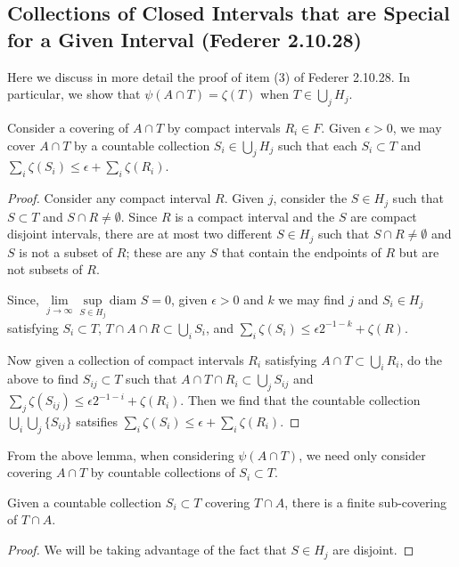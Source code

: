 \subsection{Collections of Closed Intervals that are Special for a Given Interval (Federer 2.10.28)}

Here we discuss in more detail the proof of item (3) of Federer 2.10.28. In particular, we show that 
\(\psi(A \cap T) = \zeta(T)\) when \(T \in \bigcup_j H_j\).

\begin{lemma}
Consider a covering of \(A \cap T\) by compact intervals \(R_i \in F\). Given \(\epsilon > 0\), we may
cover \(A \cap T\) by a countable collection \(S_i \in \bigcup_j H_j\) such that each \(S_i \subset T\) and
\(\sum_i \zeta(S_i) \leq \epsilon + \sum_i \zeta(R_i)\).
\end{lemma}
\begin{proof}
Consider any compact interval \(R\). Given \(j\), consider the
\(S \in H_j\) such that \(S \subset T\) and \(S \cap R \neq \emptyset\). Since \(R\) is a compact interval
and the \(S\) are compact disjoint intervals, there are at most
two different \(S \in H_j\) such that \(S \cap R \neq \emptyset\) and \(S\) is not a subset of \(R\); these
are any \(S\) that contain the endpoints of \(R\) but are not subsets of \(R\). 

Since, \(\lim\limits_{j\to \infty}\sup\limits_{S\in H_j} \text{diam } S = 0\), given \(\epsilon > 0\) and
\(k\) we may find \(j\) and \(S_i \in H_j\) satisfying \(S_i \subset T\),
\(T \cap A \cap R \subset \bigcup_i S_i\), and 
\(\sum_i \zeta(S_i) \leq \epsilon 2^{-1-k} + \zeta(R)\).

Now given a collection of compact intervals \(R_i\) satisfying \(A \cap T \subset \bigcup_i R_i\), do the above
to find \(S_{ij} \subset T\) such that \(A \cap T \cap R_i \subset \bigcup_j S_{ij}\) and
\(\sum_j \zeta(S_{ij}) \leq \epsilon 2^{-1 - i} + \zeta(R_i)\). Then we find that the countable collection
\(\bigcup_i \bigcup_j \{S_{ij}\}\) satsifies
\(\sum_i \zeta(S_i) \leq \epsilon + \sum_i \zeta(R_i)\). 
\end{proof}

From the above lemma, when considering \(\psi(A\cap T)\), we need only consider covering \(A \cap T\) by
countable collections of \(S_i \subset T\).

\begin{lemma}
Given a countable collection \(S_i \subset T\) covering \(T \cap A\), there is a finite sub-covering of
\(T \cap A\).
\end{lemma}
\begin{proof}
We will be taking advantage of the fact that \(S \in H_j\) are disjoint.
\end{proof}
